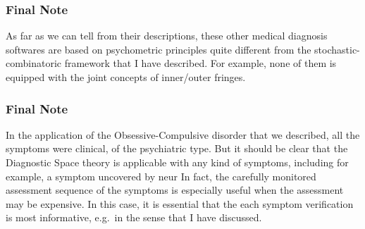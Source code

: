 \documentclass{beamer}
\def\tl{\vskip 2mm}
\begin{document}
\begin{frame}
\frametitle{Final Note}
\vspace{1cm}
\center
\begin{minipage}{9.8cm}  
 As far as we can tell from their descriptions, these other medical diagnosis softwares are based on psychometric principles quite different from the stochastic-combinatoric framework that I have described. For example, none of them is equipped with the joint concepts of inner/outer fringes.
\end{minipage}
\vspace{.5cm}

\end{frame}

\begin{frame}
\frametitle{Final Note}
\vspace{1cm}
\center
\begin{minipage}{9.2cm}  In the application of the Obsessive-Compulsive disorder that we described, all the symptoms were clinical, of the psychiatric type.
\tl
But it should be clear that the Diagnostic Space theory is applicable with any kind of symptoms, including for example, a symptom uncovered by neur 
\tl
 In fact, the carefully monitored assessment sequence of the symptoms is especially useful when the assessment may be  expensive. In this case, it is essential that the each symptom verification is most informative, e.g.~in the sense that I have discussed.
\end{minipage}
\vspace{.5cm}


\end{frame}
\end{document}
